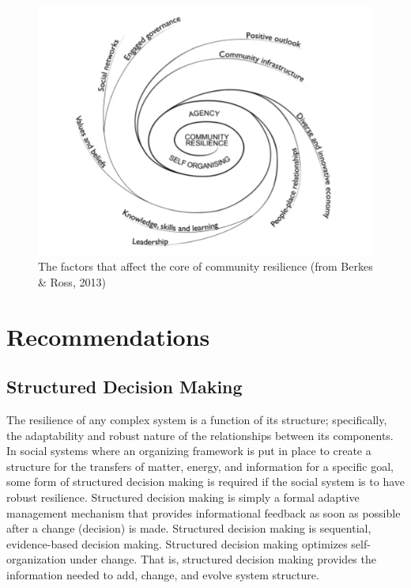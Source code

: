 \documentclass[11pt,fleqn]{book} %
\begin{document}
\begin{figure}
  \begin{center}
    \includegraphics[scale=0.95]{graphics/Community_Resilience.jpeg}
    \caption{The factors that affect the core of community resilience (from Berkes \& Ross, 2013)}
    \label{fig:bm1}
  \end{center}
\end{figure}







\chapter{Recommendations}

\section{Structured Decision Making}
The resilience of any complex system is a function of its structure; specifically, the adaptability and robust nature of the relationships between its components. In social systems where an organizing framework is put in place to create a structure for the transfers of matter, energy, and information for a specific goal, some form of structured decision making is required if the social system is to have robust resilience. Structured decision making is simply a formal adaptive management mechanism that provides informational feedback as soon as possible after a change (decision) is made. Structured decision making is sequential, evidence-based decision making.  Structured decision making optimizes self-organization under change. That is, structured decision making provides the information needed to add, change, and evolve system structure.
\end{document}
